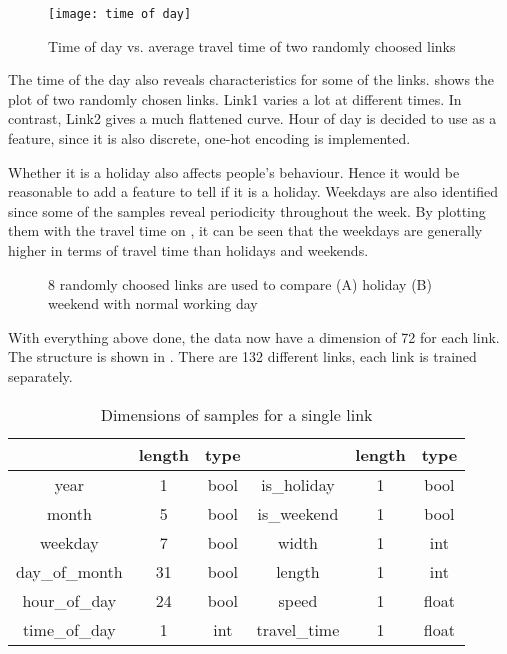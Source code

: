 \begin{figure}[!htb]
    \centering
    \texttt{[image: time of day]}
    \caption{Time of day vs. average travel time of two randomly choosed links}
    \label{Figure:time_of_day}
\end{figure}

The time of the day also reveals characteristics for some of the links.  shows the plot of two randomly chosen links.
Link1 varies a lot at different times. In contrast, Link2 gives a much flattened curve. Hour of day is decided to use as a feature, 
since it is also discrete, one-hot encoding is implemented. 

Whether it is a holiday also affects people's behaviour. Hence it would be reasonable to add a feature to tell if it is a holiday. 
Weekdays are also identified since some of the samples reveal periodicity throughout the week. 
By plotting them with the travel time on , it can be seen that the weekdays are generally higher in terms of travel time than holidays and weekends.

\begin{figure}[!htb]
    \centering
    \caption{8 randomly choosed links are used to compare (A) holiday (B) weekend with normal working day}
    \label{Figure:weekday_holiday}
\end{figure}

With everything above done, the data now have a dimension of 72 for each link. The structure is shown in . 
There are 132 different links, each link is trained separately. 

\begin{table}[!htb]
    \centering
    \begin{tabular}{c|cc|c|cc}
    \toprule
    & length & type & & length & type \\
    \midrule
    year & 1 & bool & is\_holiday & 1 & bool \\
    month & 5 & bool & is\_weekend & 1 & bool \\
    weekday & 7 & bool & width & 1 & int \\
    day\_of\_month & 31 & bool & length & 1 & int \\
    hour\_of\_day & 24 & bool & speed & 1 & float \\
    time\_of\_day & 1 & int & travel\_time & 1 & float \\
    \bottomrule
    \end{tabular}
    \caption{Dimensions of samples for a single link}
    \label{Table:Dimensions}
\end{table}

